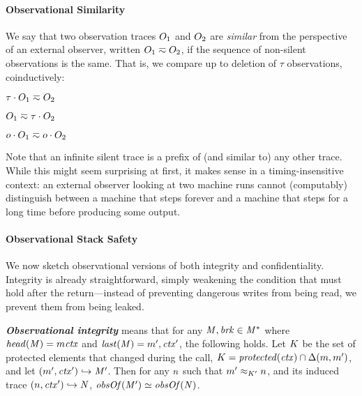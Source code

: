\documentclass[10pt,conference]{ieeetran}%
\theoremstyle{definition}
\begin{document}
{\paragraph*{Observational Similarity}

We say that two observation traces $O_1$ and $O_2$ are {\em similar}
from the perspective of an external observer, written \(O_1 \eqsim
O_2\), if the sequence of non-silent observations is the same. That is, we
compare up to deletion of \(\tau\) observations, coinductively:

\begin{minipage}{.4\columnwidth}
  \judgment{}{\(\obsT \eqsim \obsT\)}
\end{minipage}
\begin{minipage}{.4\columnwidth}
           {\(\tau \cdot O_1 \eqsim O_2\)}
\end{minipage}

\begin{minipage}{.4\columnwidth}
           {\(O_1 \eqsim \tau \cdot O_2\)}
\end{minipage}
\begin{minipage}{.4\columnwidth}
           {\(o \cdot O_1 \eqsim o \cdot O_2\)}
\end{minipage}


Note that an infinite silent trace is a
prefix of (and similar to) any other trace. While this might seem
surprising at first, it makes sense in a timing-insensitive context:
an external observer looking at two machine runs cannot (computably)
distinguish between a machine that steps forever and a machine that
steps for a long time before producing some output.

\paragraph*{Observational Stack Safety}

We now sketch observational versions of both integrity and confidentiality.
Integrity is already straightforward, simply weakening the condition that must hold
after the return---instead of preventing dangerous writes from being read, we
prevent them from being leaked.

\textbf{\em Observational integrity} means that for any \(\mathit{M},\mathit{brk} \in \mathit{M}^*\)
where \(\mathit{head}(\mathit{M}) = m\mathit{ctx}\) and \(\mathit{last}(\mathit{M}) = m',\mathit{ctx}'\),
the following holds. Let \(K\) be the set of protected elements that changed during
the call, \(K = \mathit{protected}(\mathit{ctx}) \cap \Delta(m, m')\),
and let \((m',\mathit{ctx}') \hookrightarrow \mathit{M}'\).
Then for any \(n\) such that
\(m' \approx_{K'} n\), and its induced trace
\((n,\mathit{ctx}') \hookrightarrow \mathit{N}\), \(\mathit{obsOf}(\mathit{M}') \simeq \mathit{obsOf}(\mathit{N})\).

}
\end{document}
